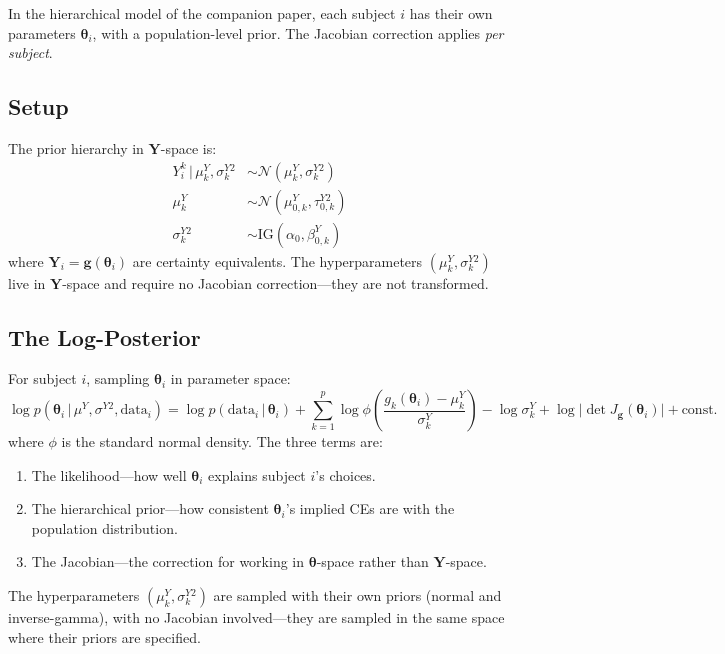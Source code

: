 \documentclass[11pt,a4paper]{article}
\theoremstyle{definition}
\newcommand{\Normal}{\mathcal{N}}
\newcommand{\given}{\,|\,}
\newcommand{\btheta}{\boldsymbol{\theta}}
\begin{document}
In the hierarchical model of the companion paper, each subject $i$ has their
own parameters $\btheta_i$, with a population-level prior. The Jacobian
correction applies \emph{per subject}.

\subsection{Setup}

The prior hierarchy in $\mathbf{Y}$-space is:
\begin{align}
    Y_i^k \given \mu_k^Y, \sigma_k^{Y2} &\sim \Normal(\mu_k^Y, \sigma_k^{Y2})
    \\
    \mu_k^Y &\sim \Normal(\mu_{0,k}^Y, \tau_{0,k}^{Y2}) \\
    \sigma_k^{Y2} &\sim \text{IG}(\alpha_0, \beta_{0,k}^Y)
\end{align}
where $\mathbf{Y}_i = \mathbf{g}(\btheta_i)$ are certainty equivalents. The
hyperparameters $(\mu_k^Y, \sigma_k^{Y2})$ live in $\mathbf{Y}$-space and
require no Jacobian correction---they are not transformed.

\subsection{The Log-Posterior}

For subject $i$, sampling $\btheta_i$ in parameter space:
\begin{equation}
    \label{eq:bhm_log_posterior}
    \log p(\btheta_i \given \mu^Y, \sigma^{Y2}, \text{data}_i) =
    \log p(\text{data}_i \given \btheta_i)
    + \sum_{k=1}^p \log \phi\!\left(\frac{g_k(\btheta_i) - \mu_k^Y}
    {\sigma_k^Y}\right) - \log \sigma_k^Y
    + \log\big|\!\det J_{\mathbf{g}}(\btheta_i)\big| + \text{const.}
\end{equation}
where $\phi$ is the standard normal density. The three terms are:
\begin{enumerate}
    \item The likelihood---how well $\btheta_i$ explains subject $i$'s choices.
    \item The hierarchical prior---how consistent $\btheta_i$'s implied CEs are
    with the population distribution.
    \item The Jacobian---the correction for working in $\btheta$-space rather
    than $\mathbf{Y}$-space.
\end{enumerate}

The hyperparameters $(\mu_k^Y, \sigma_k^{Y2})$ are sampled with their own
priors (normal and inverse-gamma), with no Jacobian involved---they are
sampled in the same space where their priors are specified.
\end{document}
